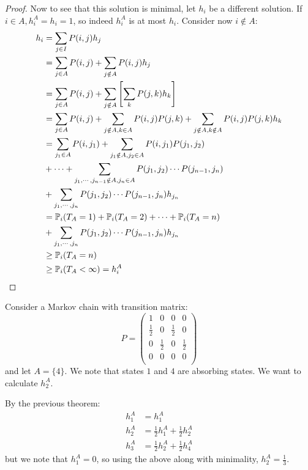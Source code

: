 \documentclass[../Main.tex]{subfiles}
\begin{document}
\begin{proof}
    Now to see that this solution is minimal, let $h_i$ be a different solution.  If $i \in A, h_i^A = h_i = 1$, so indeed $h_i^A$ is at most $h_i$. Consider now $i \notin A$:
    \begin{align*}
        h_i &= \sum_{j \in I} P(i, j) h_j \\
        &= \sum_{j \in A} P(i, j) + \sum_{j \notin A} P(i, j) h_j \\
        &= \sum_{j \in A} P(i, j) + \sum_{j \notin A} \left[\sum_k P(j, k) h_k\right] \\
        &= \sum_{j \in A} P(i, j) + \sum_{j \notin A, k \in A} P(i, j) P(j, k) + \sum_{j \notin A, k \notin A} P(i, j) P(j, k) h_k \\
        &= \sum_{j_1 \in A} P(i, j_1) + \sum_{j_1 \notin A, j_2 \in A} P(i, j_1) P(j_1, j_2) \\
        &+ \cdots + \sum_{j_1, \cdots, j_{n-1} \notin A, j_n \in A} P(j_1, j_2) \cdots P(j_{n-1}, j_n) \\
        &+ \sum_{j_1, \cdots, j_{n}} P(j_1, j_2) \cdots P(j_{n-1}, j_n)h_{j_n} \\
        &= \P_i(T_A = 1) + \P_i(T_A = 2) + \cdots + \P_i(T_A = n) \\
        &+ \sum_{j_1, \cdots, j_{n}} P(j_1, j_2) \cdots P(j_{n-1}, j_n)h_{j_n} \\
        &\geq \P_i(T_A = n) \\
        &\geq \P_i(T_A < \infty) = h_i^A
    \end{align*}
\end{proof}
\begin{example}
    Consider a Markov chain with transition matrix:
    \begin{equation*}
        P=
        \begin{pmatrix}
            1 & 0 & 0 & 0 \\
            \frac12 & 0 & \frac12 & 0 \\
            0 & \frac12 & 0 & \frac12 \\
            0 & 0 & 0 & 0\\
        \end{pmatrix}
    \end{equation*}
    and let $A = \{4\}$.
    We note that states $1$ and $4$ are absorbing states. We want to calculate $h_2^A$.

    By the previous theorem:
    \begin{align*}
        h_1^A&=h_1^A \\
        h_2^A &= \frac12 h_1^A + \frac12 h_2^A \\
        h_3^A &= \frac12 h_2^A + \frac12 h_4^A
    \end{align*}
    but we note that $h_1^A = 0$, so using the above along with minimality, $h_2^A = \frac13$.
\end{example}
\end{document}
